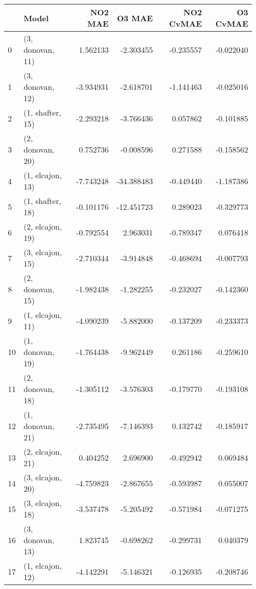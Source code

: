 \begin{tabular}{llrrrr}
\toprule
{} &             Model &   NO2 MAE &     O3 MAE &  NO2 CvMAE &  O3 CvMAE \\
\midrule
0  &  (3, donovan, 11) &  1.562133 &  -2.303455 &  -0.235557 & -0.022040 \\
1  &  (3, donovan, 12) & -3.934931 &  -2.618701 &  -1.141463 & -0.025016 \\
2  &  (1, shafter, 15) & -2.293218 &  -3.766436 &   0.057862 & -0.101885 \\
3  &  (2, donovan, 20) &  0.752736 &  -0.008596 &   0.271588 & -0.158562 \\
4  &  (1, elcajon, 13) & -7.743248 & -34.388483 &  -0.449440 & -1.187386 \\
5  &  (1, shafter, 18) & -0.101176 & -12.451723 &   0.289023 & -0.329773 \\
6  &  (2, elcajon, 19) & -0.792554 &   2.963031 &  -0.789347 &  0.076418 \\
7  &  (3, elcajon, 15) & -2.710344 &  -3.914848 &  -0.468694 & -0.007793 \\
8  &  (2, donovan, 15) & -1.982438 &  -1.282255 &  -0.232027 & -0.142360 \\
9  &  (1, elcajon, 11) & -4.090239 &  -5.882000 &  -0.137209 & -0.233373 \\
10 &  (1, donovan, 19) & -1.764438 &  -9.962449 &   0.261186 & -0.259610 \\
11 &  (2, donovan, 18) & -1.305112 &  -3.576303 &  -0.179770 & -0.193108 \\
12 &  (1, donovan, 21) & -2.735495 &  -7.146393 &   0.132742 & -0.185917 \\
13 &  (2, elcajon, 21) &  0.404252 &   2.696900 &  -0.492942 &  0.069484 \\
14 &  (3, elcajon, 20) & -4.759823 &  -2.867655 &  -0.593987 &  0.055007 \\
15 &  (3, elcajon, 18) & -3.537478 &  -5.205492 &  -0.571984 & -0.071275 \\
16 &  (3, donovan, 13) &  1.823745 &  -0.698262 &  -0.299731 &  0.040379 \\
17 &  (1, elcajon, 12) & -4.142291 &  -5.146321 &  -0.126935 & -0.208746 \\
\bottomrule
\end{tabular}
